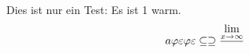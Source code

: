 \documentclass{article}
\begin{document}
    Dies ist nur ein Test:
    Es ist 1\degree{} warm.
    \[
    a \varphi \epsilon \uglyphi \uglyepsilon \subset  \supset \frac{\lim_{x\to \infty}}{}
    \] 
\end{document}
